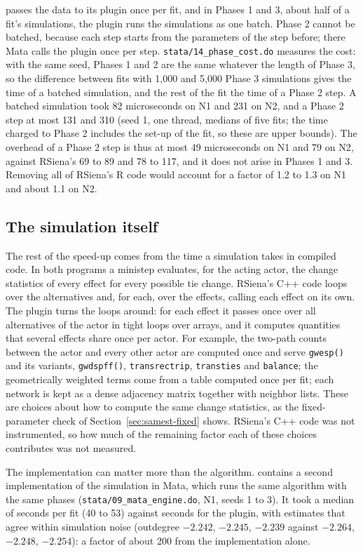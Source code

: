 \nwsaom{} passes the data to its plugin once per fit, and in Phases 1 and 3, about
half of a fit's simulations, the plugin runs the simulations as one batch. Phase 2
cannot be batched, because each step starts from the parameters of the step before;
there Mata calls the plugin once per step. \texttt{stata/14\_phase\_cost.do}
measures the cost: with the same seed, Phases 1 and 2 are the same whatever the
length of Phase 3, so the difference between fits with 1,000 and 5,000 Phase 3
simulations gives the time of a batched simulation, and the rest of the fit the time
of a Phase 2 step. A batched simulation took 82 microseconds on N1 and 231 on N2,
and a Phase 2 step at most 131 and 310 (seed 1, one thread, medians of five fits;
the time charged to Phase 2 includes the set-up of the fit, so these are upper
bounds). The overhead of a Phase 2 step is thus at most 49 microseconds on N1 and 79
on N2, against RSiena's 69 to 89 and 78 to 117, and it does not arise in Phases 1
and 3. Removing all of RSiena's R code would account for a factor of 1.2 to 1.3 on
N1 and about 1.1 on N2.

\subsection{The simulation itself}\label{sec:samest-sim}

The rest of the speed-up comes from the time a simulation takes in compiled code.
In both programs a ministep evaluates, for the acting actor, the change statistics
of every effect for every possible tie change. RSiena's C++ code loops over the
alternatives and, for each, over the effects, calling each effect on its own. The
plugin turns the loops around: for each effect it passes once over all alternatives
of the actor in tight loops over arrays, and it computes quantities that several
effects share once per actor. For example, the two-path counts between the actor
and every other actor are computed once and serve \texttt{gwesp()} and its variants,
\texttt{gwdspff()}, \texttt{transrectrip}, \texttt{transties} and \texttt{balance};
the geometrically weighted terms come from a table computed once per fit; each
network is kept as a dense adjacency matrix together with neighbor lists. These are
choices about how to compute the same change statistics, as the fixed-parameter
check of Section~\ref{sec:samest-fixed} shows. RSiena's C++ code was not
instrumented, so how much of the remaining factor each of these choices contributes
was not measured.

The implementation can matter more than the algorithm. \nwsaom{} contains a second
implementation of the simulation in Mata, which runs the same algorithm with the
same phases (\texttt{stata/09\_mata\_engine.do}, N1, seeds 1 to 3). It took a median
of \benchmataNone{} seconds per fit (40 to 53) against \benchnwNone{} seconds for the
plugin, with estimates that agree within simulation noise (outdegree $-2.242$,
$-2.245$, $-2.239$ against $-2.264$, $-2.248$, $-2.254$): a factor of about 200 from
the implementation alone.

